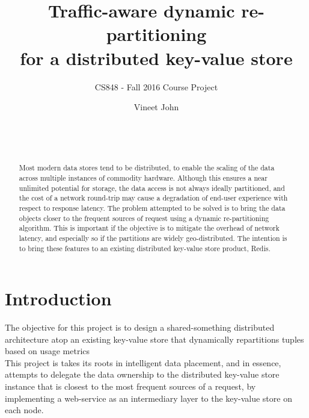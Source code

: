 \documentclass{sig-alternate}
\begin{document}
\title{Traffic-aware dynamic re-partitioning\\for a distributed key-value store}
\subtitle{CS848 - Fall 2016 Course Project}


\author{
	\alignauthor Vineet John\\
	\\
	\\
	\\
}


\maketitle
\begin{abstract}
Most modern data stores tend to be distributed, to enable the scaling of the data across multiple instances of commodity hardware. Although this ensures a near unlimited potential for storage, the data access is not always ideally partitioned, and the cost of a network round-trip may cause a degradation of end-user experience with respect to response latency. The problem attempted to be solved is to bring the data objects closer to the frequent sources of request using a dynamic re-partitioning algorithm. This is important if the objective is to mitigate the overhead of network latency, and especially so if the partitions are widely geo-distributed. The intention is to bring these features to an existing distributed key-value store product, Redis\cite{redis-website}.
\end{abstract}




\section{Introduction}

The objective for this project is to design a shared-something distributed architecture atop an existing key-value store that dynamically repartitions tuples based on usage metrics\\

This project is takes its roots in intelligent data placement, and in essence, attempts to delegate the data ownership to the distributed key-value store instance that is closest to the most frequent sources of a request, by implementing a web-service as an intermediary layer to the key-value store on each node. \\
\end{document}
